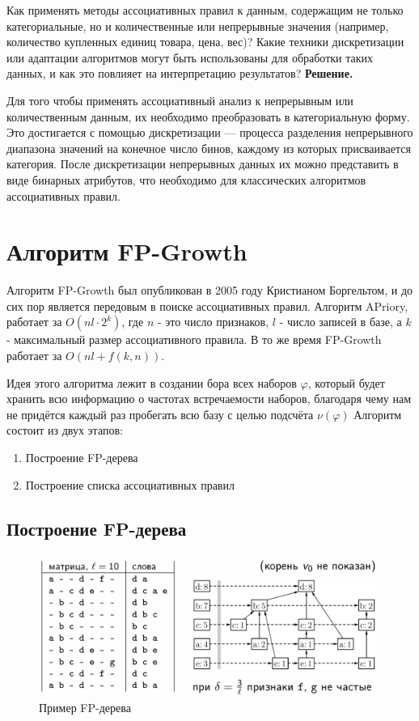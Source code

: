 Как применять методы ассоциативных правил к данным, содержащим не только категориальные, но и количественные или непрерывные значения (например, количество купленных единиц товара, цена, вес)? Какие техники дискретизации или адаптации алгоритмов могут быть использованы для обработки таких данных, и как это повлияет на интерпретацию результатов?
\newline
\textbf{Решение.}

Для того чтобы применять ассоциативный анализ к непрерывным или количественным данным, их необходимо преобразовать в категориальную форму. Это достигается с помощью дискретизации — процесса разделения непрерывного диапазона значений на конечное число бинов, каждому из которых присваивается категория. После дискретизации непрерывных данных их можно представить в виде бинарных атрибутов, что необходимо для классических алгоритмов ассоциативных правил.

\section{Алгоритм FP-Growth}
Алгоритм FP-Growth был опубликован в 2005 году Кристианом Боргельтом, и до сих пор является передовым в поиске ассоциативных правил. Алгоритм APriory, работает за $O(nl\cdot 2^k)$, где $n$ - это число признаков, $l$ - число записей в базе, а $k$ - максимальный размер ассоциативного правила. В то же время FP-Growth работает за $O(nl + f(k, n))$.

Идея этого алгоритма лежит в создании бора всех наборов $\varphi$, который будет хранить всю информацию о частотах встречаемости наборов, благодаря чему нам не придётся каждый раз пробегать всю базу с целью подсчёта $\nu(\varphi)$
\newline\newline
Алгоритм состоит из двух этапов:
\begin{enumerate}
    \item Построение FP-дерева
    \item Построение списка ассоциативных правил
\end{enumerate}

\subsection{Построение FP-дерева}

\begin{figure}[h]
    \centering
    \includegraphics[width=0.8\linewidth]{chapters/rules/images/fp-tree-example.png}
    \caption{Пример FP-дерева}
\end{figure}


